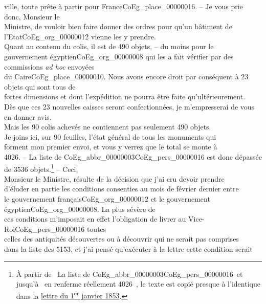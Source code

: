 \documentclass{book}
\begin{document}
\noindent ville, toute prête à partir pour France\gls{CoEg_place_00000016}. – Je vous prie donc, Monsieur le\\
Ministre, de vouloir bien faire donner des ordres pour qu’un bâtiment de\\
l’Etat\gls{CoEg_org_00000012} vienne les y prendre.\\
\indent Quant au contenu du colis, il est de 490 objets, – du moins pour le\\
gouvernement égyptien\gls{CoEg_org_00000008} qui les a fait vérifier par des commissions \textit{ad hoc} envoyées\\
du Caire\gls{CoEg_place_00000010}. Nous avons encore droit par conséquent à 23 objets qui sont tous de\\
fortes dimensions et dont l’expédition ne pourra être faite qu’ultérieurement.\\
Dès que ces 23 nouvelles caisses seront confectionnées, je m’empresserai de vous\\
en donner avis.\\
\indent Mais les 90 colis achevés ne contiennent pas seulement 490 objets.\\
Je joins ici, sur 90 feuilles, l’état général de tous les monuments qui\\
forment mon premier envoi, et vous y verrez que le total se monte à\\
4026. – La liste de \gls{CoEg_abbr_00000003}\gls{CoEg_pers_00000016} est donc dépassée de 3536 objets.\footnote{À partir de \og ~La liste de \gls{CoEg_abbr_00000003}\gls{CoEg_pers_00000016}~\fg et jusqu'à \og ~en renferme réellement 4026~\fg, le texte est copié presque à l'identique dans la \hyperref[CoEg_Mariette_1853-01-01]{lettre du 1\textsuperscript{er} janvier 1853}.} – Ceci,\\
Monsieur le Ministre, résulte de la décision que j’ai cru devoir prendre\\
d’éluder en partie les conditions consenties au mois de février dernier entre\\
le gouvernement français\gls{CoEg_org_00000012} et le gouvernement égyptien\gls{CoEg_org_00000008}. La plus sévère de\\
ces conditions m’imposait en effet l’obligation de livrer au Vice-Roi\gls{CoEg_pers_00000016} toutes\\
celles des antiquités découvertes ou à découvrir qui ne serait pas comprises\\
dans la liste des 5153, et j’ai pensé qu’exécuter à la lettre cette condition serait\\
\end{document}
